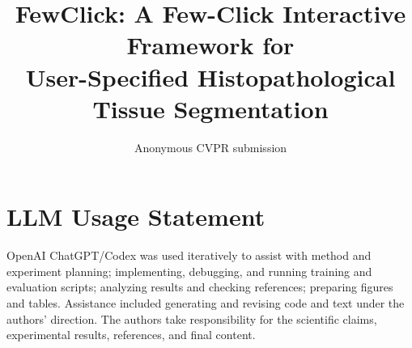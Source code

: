 \documentclass[10pt,twocolumn,letterpaper]{article}
\title{FewClick: A Few-Click Interactive Framework for\\User-Specified Histopathological Tissue Segmentation}
\author{Anonymous CVPR submission}
\begin{document}
\maketitle






\label{page:main-end}
\clearpage
\section*{LLM Usage Statement}
OpenAI ChatGPT/Codex was used iteratively to assist with method and experiment planning; implementing, debugging, and running training and evaluation scripts; analyzing results and checking references; preparing figures and tables. Assistance included generating and revising code and text under the authors' direction. The authors take responsibility for the scientific claims, experimental results, references, and final content.

{\small}
\end{document}
